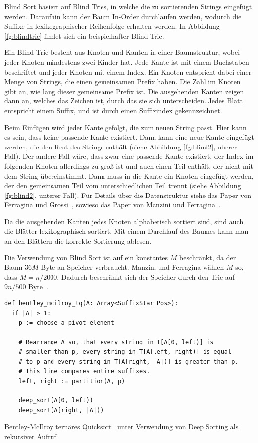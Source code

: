 Blind Sort basiert auf Blind Tries, in welche die zu sortierenden Strings eingefügt werden.
Daraufhin kann der Baum In-Order durchlaufen werden, wodurch die Suffixe in lexikographischer Reihenfolge erhalten werden.
In Abbildung \ref{fg:blindtrie} findet sich ein beispielhafter Blind-Trie.

Ein Blind Trie besteht aus Knoten und Kanten in einer Baumstruktur, wobei jeder Knoten mindestens zwei Kinder hat.
Jede Kante ist mit einem Buchstaben beschriftet und jeder Knoten mit einem Index.
Ein Knoten entspricht dabei einer Menge von Strings, die einen gemeinsamen Prefix haben.
Die Zahl im Knoten gibt an, wie lang dieser gemeinsame Prefix ist.
Die ausgehenden Kanten zeigen dann an, welches das Zeichen ist, durch das sie sich unterscheiden.
Jedes Blatt entspricht einem Suffix, und ist durch einen Suffixindex gekennzeichnet.

Beim Einfügen wird jeder Kante gefolgt, die zum neuen String passt.
Hier kann es sein, dass keine passende Kante existiert.
Dann kann eine neue Kante eingefügt werden, die den Rest des Strings enthält (siehe Abbildung \ref{fg:blind2}, oberer Fall).
Der andere Fall wäre, dass zwar eine passende Kante existiert, der Index im folgenden Knoten allerdings zu groß ist und auch einen Teil enthält, der nicht mit dem String übereinstimmt.
Dann muss in die Kante ein Knoten eingefügt werden, der den gemeinsamen Teil vom unterschiedlichen Teil trennt (siehe Abbildung \ref{fg:blind2}, unterer Fall).
Für Details über die Datenstruktur siehe das Paper von Ferragina und Grossi~\cite{ds:blind}, sowieso das Paper von Manzini und Ferragina~\cite{saca:4}.

Da die ausgehenden Kanten jedes Knoten alphabetisch sortiert sind, sind auch die Blätter lexikographisch sortiert.
Mit einem Durchlauf des Baumes kann man an den Blättern die korrekte Sortierung ablesen.

Die Verwendung von Blind Sort ist auf ein konstantes $M$ beschränkt, da der Baum $36 M$ Byte an Speicher verbraucht.
Manzini und Ferragina wählen $M$ so, dass $M = n / 2000$.
Dadurch beschränkt sich der Speicher durch den Trie auf $9n/500$ Byte~\cite{saca:4}.

\begin{listing}[!t]
\begin{verbatim}
def bentley_mcilroy_tq(A: Array<SuffixStartPos>):
  if |A| > 1:
    p := choose a pivot element

    # Rearrange A so, that every string in T[A[0, left)] is
    # smaller than p, every string in T[A[left, right)] is equal
    # to p and every string in T[A[right, |A|)] is greater than p.
    # This line compares entire suffixes.
    left, right := partition(A, p)

    deep_sort(A[0, left))
    deep_sort(A[right, |A|))
\end{verbatim}
\caption{Bentley-McIlroy ternäres Quicksort~\cite{ternary_quicksort} unter Verwendung von Deep Sorting als rekursiver Aufruf}
\end{listing}

